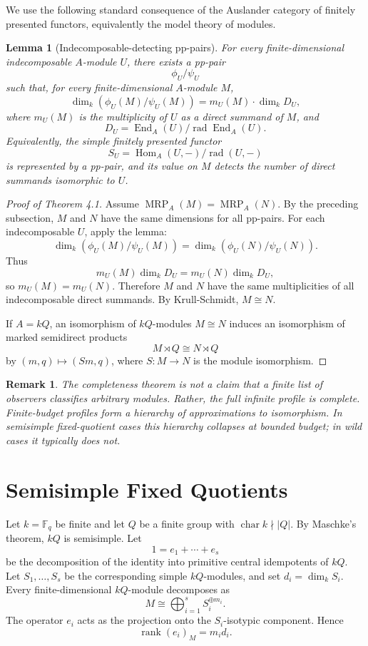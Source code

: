 \documentclass[11pt]{article}
\newtheorem{lemma}[theorem]{Lemma}
\newtheorem{remark}[theorem]{Remark}
\begin{document}
We use the following standard consequence of the Auslander category of finitely presented functors, equivalently the model theory of modules.

\begin{lemma}[Indecomposable-detecting pp-pairs]
For every finite-dimensional indecomposable $A$-module $U$, there exists a pp-pair
\[
\phi_U/\psi_U
\]
such that, for every finite-dimensional $A$-module $M$,
\[
\dim_k(\phi_U(M)/\psi_U(M))
=
m_U(M)\cdot \dim_k D_U,
\]
where $m_U(M)$ is the multiplicity of $U$ as a direct summand of $M$, and
\[
D_U=\operatorname{End}_A(U)/\operatorname{rad}\operatorname{End}_A(U).
\]
Equivalently, the simple finitely presented functor
\[
S_U=\operatorname{Hom}_A(U,-)/\operatorname{rad}(U,-)
\]
is represented by a pp-pair, and its value on $M$ detects the number of direct summands isomorphic to $U$.
\end{lemma}

\begin{proof}[Proof of Theorem 4.1]
Assume $\operatorname{MRP}_A(M)=\operatorname{MRP}_A(N)$. By the preceding subsection, $M$ and $N$ have the same dimensions for all pp-pairs. For each indecomposable $U$, apply the lemma:
\[
\dim_k(\phi_U(M)/\psi_U(M))
=
\dim_k(\phi_U(N)/\psi_U(N)).
\]
Thus
\[
m_U(M)\dim_kD_U=m_U(N)\dim_kD_U,
\]
so $m_U(M)=m_U(N)$. Therefore $M$ and $N$ have the same multiplicities of all indecomposable direct summands. By Krull-Schmidt, $M\cong N$.

If $A=kQ$, an isomorphism of $kQ$-modules $M\cong N$ induces an isomorphism of marked semidirect products
\[
M\rtimes Q\cong N\rtimes Q
\]
by $(m,q)\mapsto (Sm,q)$, where $S:M\to N$ is the module isomorphism.
\end{proof}

\begin{remark}
The completeness theorem is not a claim that a finite list of observers classifies arbitrary modules. Rather, the full infinite profile is complete. Finite-budget profiles form a hierarchy of approximations to isomorphism. In semisimple fixed-quotient cases this hierarchy collapses at bounded budget; in wild cases it typically does not.
\end{remark}

\section{Semisimple Fixed Quotients}

Let $k=\mathbb F_q$ be finite and let $Q$ be a finite group with $\operatorname{char}k\nmid |Q|$. By Maschke's theorem, $kQ$ is semisimple. Let
\[
1=e_1+\cdots+e_s
\]
be the decomposition of the identity into primitive central idempotents of $kQ$. Let $S_1,\ldots,S_s$ be the corresponding simple $kQ$-modules, and set $d_i=\dim_k S_i$. Every finite-dimensional $kQ$-module decomposes as
\[
M\cong \bigoplus_{i=1}^s S_i^{\oplus m_i}.
\]
The operator $e_i$ acts as the projection onto the $S_i$-isotypic component. Hence
\[
\operatorname{rank}(e_i)_M=m_i d_i.
\]
\end{document}
